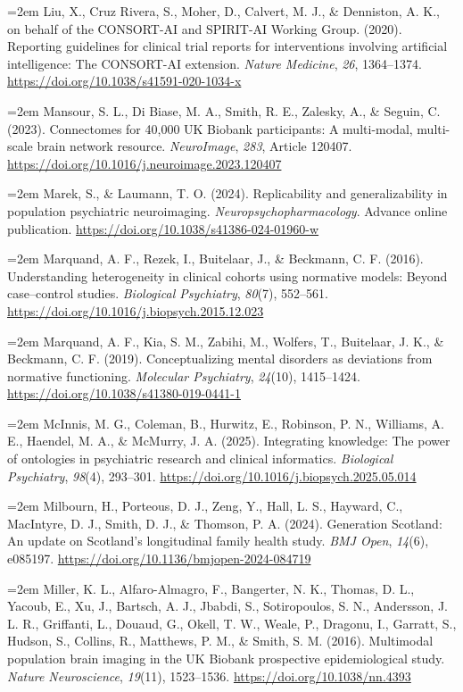 \documentclass[11pt,a4paper,twoside]{article}
\begin{document}
\hangindent=2em Liu, X., Cruz Rivera, S., Moher, D., Calvert, M. J., \& Denniston, A. K., on behalf of the CONSORT-AI and SPIRIT-AI Working Group. (2020). Reporting guidelines for clinical trial reports for interventions involving artificial intelligence: The CONSORT-AI extension. \textit{Nature Medicine}, \textit{26}, 1364--1374. \url{https://doi.org/10.1038/s41591-020-1034-x}

\hangindent=2em Mansour, S. L., Di Biase, M. A., Smith, R. E., Zalesky, A., \& Seguin, C. (2023). Connectomes for 40,000 UK Biobank participants: A multi-modal, multi-scale brain network resource. \textit{NeuroImage}, \textit{283}, Article 120407. \url{https://doi.org/10.1016/j.neuroimage.2023.120407}

\hangindent=2em Marek, S., \& Laumann, T. O. (2024). Replicability and generalizability in population psychiatric neuroimaging. \textit{Neuropsychopharmacology}. Advance online publication. \url{https://doi.org/10.1038/s41386-024-01960-w}

\hangindent=2em Marquand, A. F., Rezek, I., Buitelaar, J., \& Beckmann, C. F. (2016). Understanding heterogeneity in clinical cohorts using normative models: Beyond case--control studies. \textit{Biological Psychiatry}, \textit{80}(7), 552--561. \url{https://doi.org/10.1016/j.biopsych.2015.12.023}

\hangindent=2em Marquand, A. F., Kia, S. M., Zabihi, M., Wolfers, T., Buitelaar, J. K., \& Beckmann, C. F. (2019). Conceptualizing mental disorders as deviations from normative functioning. \textit{Molecular Psychiatry}, \textit{24}(10), 1415--1424. \url{https://doi.org/10.1038/s41380-019-0441-1}

\hangindent=2em McInnis, M. G., Coleman, B., Hurwitz, E., Robinson, P. N., Williams, A. E., Haendel, M. A., \& McMurry, J. A. (2025). Integrating knowledge: The power of ontologies in psychiatric research and clinical informatics. \textit{Biological Psychiatry}, \textit{98}(4), 293--301. \url{https://doi.org/10.1016/j.biopsych.2025.05.014}

\hangindent=2em Milbourn, H., Porteous, D. J., Zeng, Y., Hall, L. S., Hayward, C., MacIntyre, D. J., Smith, D. J., \& Thomson, P. A. (2024). Generation Scotland: An update on Scotland's longitudinal family health study. \textit{BMJ Open}, \textit{14}(6), e085197. \url{https://doi.org/10.1136/bmjopen-2024-084719}

\hangindent=2em Miller, K. L., Alfaro-Almagro, F., Bangerter, N. K., Thomas, D. L., Yacoub, E., Xu, J., Bartsch, A. J., Jbabdi, S., Sotiropoulos, S. N., Andersson, J. L. R., Griffanti, L., Douaud, G., Okell, T. W., Weale, P., Dragonu, I., Garratt, S., Hudson, S., Collins, R., Matthews, P. M., \& Smith, S. M. (2016). Multimodal population brain imaging in the UK Biobank prospective epidemiological study. \textit{Nature Neuroscience}, \textit{19}(11), 1523--1536. \url{https://doi.org/10.1038/nn.4393}
\end{document}
